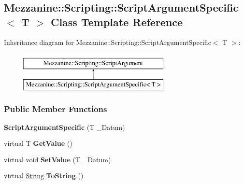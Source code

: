 \hypertarget{classMezzanine_1_1Scripting_1_1ScriptArgumentSpecific}{
\subsection{Mezzanine::Scripting::ScriptArgumentSpecific$<$ T $>$ Class Template Reference}
\label{classMezzanine_1_1Scripting_1_1ScriptArgumentSpecific}
}
Inheritance diagram for Mezzanine::Scripting::ScriptArgumentSpecific$<$ T $>$:\begin{figure}[H]
\begin{center}
\leavevmode
\includegraphics[height=2.000000cm]{classMezzanine_1_1Scripting_1_1ScriptArgumentSpecific}
\end{center}
\end{figure}
\subsubsection*{Public Member Functions}
\begin{DoxyCompactItemize}
\item 
\hypertarget{classMezzanine_1_1Scripting_1_1ScriptArgumentSpecific_a3b4861672cee9cabb2491c87f2f441e2}{
{\bfseries ScriptArgumentSpecific} (T \_\-Datum)}
\label{classMezzanine_1_1Scripting_1_1ScriptArgumentSpecific_a3b4861672cee9cabb2491c87f2f441e2}

\item 
\hypertarget{classMezzanine_1_1Scripting_1_1ScriptArgumentSpecific_a2222ba31af7cf6b144a6534266545909}{
virtual T {\bfseries GetValue} ()}
\label{classMezzanine_1_1Scripting_1_1ScriptArgumentSpecific_a2222ba31af7cf6b144a6534266545909}

\item 
\hypertarget{classMezzanine_1_1Scripting_1_1ScriptArgumentSpecific_a42e1b191b5ad6bf6d6690f7227aae5c9}{
virtual void {\bfseries SetValue} (T \_\-Datum)}
\label{classMezzanine_1_1Scripting_1_1ScriptArgumentSpecific_a42e1b191b5ad6bf6d6690f7227aae5c9}

\item 
\hypertarget{classMezzanine_1_1Scripting_1_1ScriptArgumentSpecific_a43af3a76900dc54e4cd2c6f52fc97477}{
virtual \hyperlink{namespaceMezzanine_acf9fcc130e6ebf08e3d8491aebcf1c86}{String} {\bfseries ToString} ()}
\label{classMezzanine_1_1Scripting_1_1ScriptArgumentSpecific_a43af3a76900dc54e4cd2c6f52fc97477}

\end{DoxyCompactItemize}


